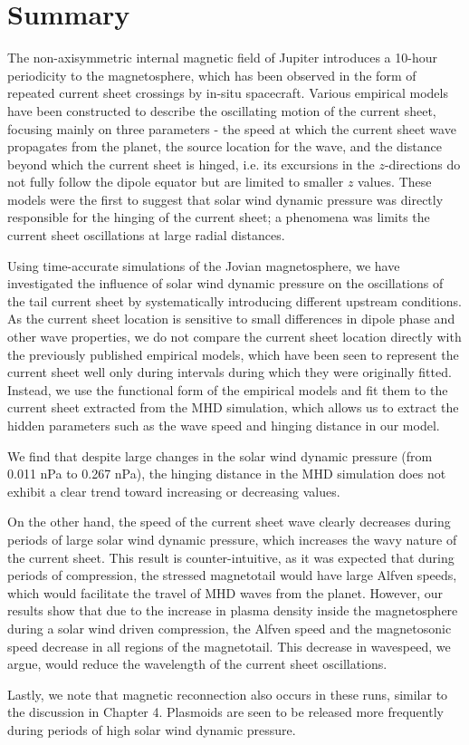 \section{Summary}

The non-axisymmetric internal magnetic field of Jupiter introduces a 10-hour periodicity to the magnetosphere, which has been observed in the form of repeated current sheet crossings by in-situ spacecraft. Various empirical models have been constructed to describe the oscillating motion of the current sheet, focusing mainly on three parameters - the speed at which the current sheet wave propagates from the planet, the source location for the wave, and the distance beyond which the current sheet is hinged, i.e. its excursions in the $z$-directions do not fully follow the dipole equator but are limited to smaller $z$ values. These models were the first to suggest that solar wind dynamic pressure was directly responsible for the hinging of the current sheet; a phenomena was limits the current sheet oscillations at large radial distances. 

Using time-accurate simulations of the Jovian magnetosphere, we have investigated the influence of solar wind dynamic pressure on the oscillations of the tail current sheet by systematically introducing different upstream conditions. As the current sheet location is sensitive to small differences in dipole phase and other wave properties, we do not compare the current sheet location directly with the previously published empirical models, which have been seen to represent the current sheet well only during intervals during which they were originally fitted. Instead, we use the functional form of the empirical models and fit them to the current sheet extracted from the MHD simulation, which allows us to extract the hidden parameters such as the wave speed and hinging distance in our model. 

We find that despite large changes in the solar wind dynamic pressure (from 0.011 nPa to 0.267 nPa), the hinging distance in the MHD simulation does not exhibit a clear trend toward increasing or decreasing values. 

On the other hand, the speed of the current sheet wave clearly decreases during periods of large solar wind dynamic pressure, which increases the wavy nature of the current sheet. This result is counter-intuitive, as it was expected that during periods of compression, the stressed magnetotail would have large Alfven speeds, which would facilitate the travel of MHD waves from the planet. However, our results show that due to the increase in plasma density inside the magnetosphere during a solar wind driven compression, the Alfven speed and the magnetosonic speed decrease in all regions of the magnetotail. This decrease in wavespeed, we argue, would reduce the wavelength of the current sheet oscillations. 

Lastly, we note that magnetic reconnection also occurs in these runs, similar to the discussion in Chapter 4. Plasmoids are seen to be released more frequently during periods of high solar wind dynamic pressure. 

